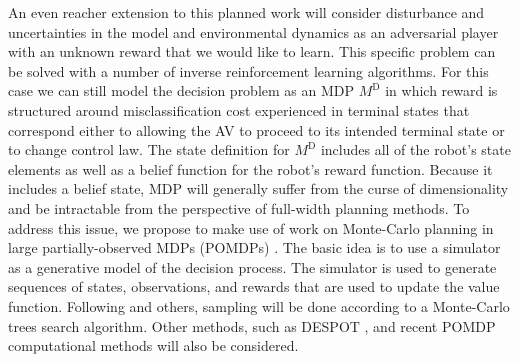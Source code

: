 An even reacher extension to this planned work will consider disturbance and uncertainties in the model and environmental dynamics as an adversarial player with an unknown reward that we would like to learn. This specific problem can be solved with a number of inverse reinforcement learning algorithms. 
For this case we can still model the decision problem as an MDP $M^{\mbox{D}}$ in which reward is structured around misclassification cost experienced in terminal states that correspond either to allowing the AV to proceed to its intended terminal state or to change control law. The state definition for $M^{\mbox{D}}$ includes all of the robot's state elements as well as a belief function for the robot's reward function.
Because it includes a belief state, MDP will generally suffer from the curse of dimensionality and be intractable from the perspective of full-width planning methods.  To address this issue, we propose to make use of  work on Monte-Carlo planning in large partially-observed MDPs (POMDPs) \cite{silver2010monte}.  The basic idea is to use a simulator as a generative model of the decision process.  The simulator is used to generate sequences of states, observations, and rewards that are used to update the value function.  
Following \cite{silver2010monte} and others, sampling will be done according to a Monte-Carlo trees search algorithm.  Other methods, such as DESPOT  \cite{somani2013despot}, and  recent POMDP computational methods \cite{baier2012nested,guez2012efficient,guez2013scalable,vien2013monte}  will also be considered.


